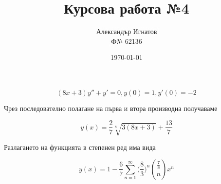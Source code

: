 \documentclass{article}
\title{Курсова работа №4}
\author{Александър Игнатов \\ Ф№ 62136 }
\date{\today}
\begin{document}
\maketitle

\[
    (8x+3)y'' + y' = 0, y(0) = 1, y'(0) = -2
\]

Чрез последователно полагане на първа и втора производна получаваме

\[
    y(x) = \frac{2}{7}\sqrt[8]{3(8x+3)} + \frac{13}{7}
\]

Разлагането на функцията в степенен ред има вида

\[
    y(x) = 1 - \frac{6}{7}\sum_{n=1}^{\infty} \bigg(\frac{8}{3}\bigg)^n \binom{\frac{7}{8}}{n} x^n
\]
\end{document}

